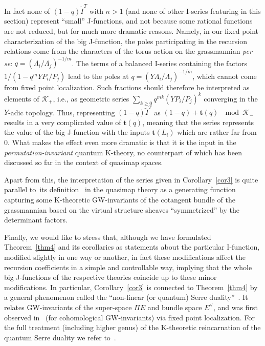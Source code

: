 \documentclass[10pt,a4paper]{amsart}
\numberwithin{equation}{section}
\def\K{\mathcal K}
\def\tilde{\widetilde}
\def\t{{\mathbf t}}
\theoremstyle{definition}
\theoremstyle{plain}
\begin{document}
In fact none of $(1-q) \tilde{I}^T$ with $n>1$ (and none of other I-series featuring in this section) represent ``small'' J-functions, and not because some rational functions are not reduced, but for much more dramatic reasons. Namely, in our fixed point characterization of the big J-function, the poles participating in the recursion relations come from the characters of the torus action on the grassmannian {\em per se}: $q=(\Lambda_i/\Lambda_j)^{-1/m}$. The terms of a balanced I-series containing the factors $1/(1-q^mYP_i/P_j)$ lead to the poles at $q=(Y\Lambda_i/\Lambda_j)^{-1/m}$, which cannot come from fixed point localization. Such fractions should therefore be interpreted as elements of $\K_{+}$, i.e., as geometric series $\sum_{k\geq 0}q^{mk}(YP_i/P_j)^k$ converging in the $Y$-adic topology. Thus, representing $(1-q) \tilde{I}^T$ as $(1-q)+\t(q) \ \mod \K_{-}$ results in a very complicated value of $\t(q)$, meaning that the series represents the value of the big J-function with the inputs $\t(L_i)$ which are rather far from~$0$. What makes the effect even more dramatic is that it is the input in the {\em permutation-invariant} quantum K-theory, no counterpart of which has been discussed so far in the context of quasimap spaces.

Apart from this, the interpretation of the series given in Corollary~\ref{cor3} is quite parallel to~its definition~\cite{KPSZ, Ok, PSZ} in the quasimap theory as a generating function capturing some K-theoretic GW-invariants of the cotangent bundle of the grassmannian based on the virtual structure sheaves ``symmetrized'' by the determinant factors.

Finally, we would like to stress that, although we have formulated Theorem~\ref{thm4} and its corollaries as statements about the particular I-function, modified slightly in one way or another, in fact these modifications affect the recursion coefficients in a simple and controllable way, implying that the whole big J-functions of the respective theories coincide up to these minor modifications. In particular, Corollary~\ref{cor3} is connected to Theorem~\ref{thm4} by a general phenomenon called the ``non-linear (or quantum) Serre duality''~\cite{Coates-Givental}. It relates GW-invariants of the super-space $\Pi E$ and bundle space $E^{\vee}$, and was first observed in~\cite{Givental:EGWI} (for cohomological GW-invariants) via fixed point localization. For the full treatment (including higher genus) of the K-theoretic reincarnation of the quantum Serre duality we refer to~\cite{Yan}.
\end{document}
